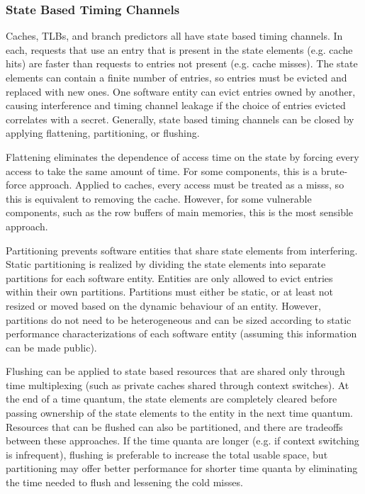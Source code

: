 \subsubsection{State Based Timing Channels}
Caches, TLBs, and branch predictors all have state based timing channels. In 
each, requests that use an entry that is present in the state elements (e.g.  
cache hits) are faster than requests to entries not present (e.g. cache 
misses). The state elements can contain a finite number of entries, so entries 
must be evicted and replaced with new ones. One software entity can evict 
entries owned by another, causing interference and timing channel leakage if 
the choice of entries evicted correlates with a secret. Generally, state based 
timing channels can be closed by applying flattening, partitioning, or 
flushing.

Flattening eliminates the dependence of access time on the state by forcing 
every access to take the same amount of time. For some components, this is a 
brute-force approach. Applied to caches, every access must be treated as a 
misss, so this is equivalent to removing the cache. However, for some 
vulnerable components, such as the row buffers of main memories, this is the 
most sensible approach.

Partitioning prevents software entities that share state elements from 
interfering. Static partitioning is realized by dividing the state elements 
into separate partitions for each software entity. Entities are only allowed to 
evict entries within their own partitions. Partitions must either be static, or 
at least not resized or moved based on the dynamic behaviour of an entity.
However, partitions do not need to be heterogeneous and can be sized according 
to static performance characterizations of each software entity (assuming this 
information can be made public).

Flushing can be applied to state based resources that are shared only through 
time multiplexing (such as private caches shared through context switches).  At 
the end of a time quantum, the state elements are completely cleared before 
passing ownership of the state elements to the entity in the next time quantum.  
Resources that can be flushed can also be partitioned, and there are tradeoffs 
between these approaches.
If the time quanta are longer (e.g. if context switching is infrequent), 
flushing is preferable to increase the total usable space, but partitioning may 
offer better performance for shorter time quanta by eliminating the time needed 
to flush and lessening the cold misses.

